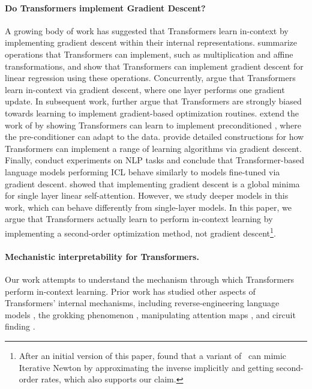 \paragraph{Do Transformers implement Gradient Descent? }
A growing body of work has suggested that Transformers learn in-context by implementing gradient descent within their internal representations.
\citet{Akyrek2022WhatLA} summarize operations that Transformers can implement, such as multiplication and affine transformations, and show that Transformers can implement gradient descent for linear regression using these operations.
Concurrently, \citet{Oswald2022TransformersLI} argue that Transformers learn in-context via gradient descent, where one layer performs one gradient update.
In subsequent work, \citet{Oswald2023UncoveringMA} further argue that Transformers are strongly biased towards learning to implement gradient-based optimization routines.
\citet{Ahn2023TransformersLT} extend the work of \citet{Oswald2022TransformersLI} by showing Transformers can learn to implement preconditioned \gd, where the pre-conditioner can adapt to the data. 
\citet{Bai2023TransformersAS} provide detailed constructions for how Transformers can implement a range of learning algorithms via gradient descent.
Finally, \citet{Dai2023WhyCG} conduct experiments on NLP tasks and conclude that Transformer-based language models performing ICL behave similarly to models fine-tuned via gradient descent.
\citet{mahankali2024one} showed that implementing gradient descent is a global minima for single layer linear self-attention. However, we study deeper models in this work, which can behave differently from single-layer models.
In this paper, we argue that Transformers actually learn to perform in-context learning by implementing a second-order optimization method, not gradient descent\footnote{After an initial version of this paper, \citet{vladymyrov2024linear} found that a variant of \gd\ can mimic Iterative Newton by approximating the inverse implicitly and getting second-order rates, which also supports our claim.}.

\paragraph{Mechanistic interpretability for Transformers. }
Our work attempts to understand the mechanism through which Transformers perform in-context learning.
Prior work has studied other aspects of Transformers' internal mechanisms, including 
reverse-engineering language models \citep{wang2022interpretability}, the grokking phenomenon  \citep{power2022grokking,nanda2023progress}, manipulating attention maps
\citep{hassid2022does}, and circuit finding \citep{conmy2023automated}. 

